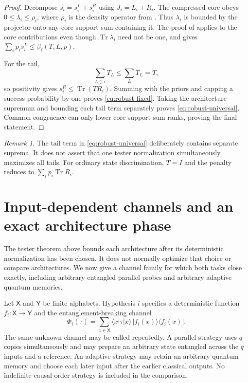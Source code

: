 \documentclass[11pt]{article}
\theoremstyle{definition}
\theoremstyle{remark}
\newtheorem{remark}[theorem]{Remark}
\newcommand{\Tr}{\operatorname{Tr}}
\newcommand{\ket}[1]{\lvert #1\rangle}
\newcommand{\bra}[1]{\langle #1\rvert}
\begin{document}
\begin{proof}
Decompose $s_i=s_i^L+s_i^R$ using $J_i=L_i+R_i$.  The compressed core obeys
$0\leq\lambda_i\leq\rho_i$, where $\rho_i$ is the density operator from
.  Thus $\lambda_i$ is bounded by the projector onto
any core support sum containing it.  The proof of  applies to
the core contributions even though $\Tr\lambda_i$ need not be one, and gives
$\sum_i p_i s_i^L\leq\beta_\ell(T,L,p)$.

For the tail,
\[
 \sum_{L\ni i}T_L\leq\sum_LT_L=T,
\]
so positivity gives $s_i^R\leq\Tr(TR_i)$.  Summing with the priors and capping
a success probability by one proves \eqref{eq:robust-fixed}.  Taking the
architecture supremum and bounding each tail term separately proves
\eqref{eq:robust-universal}.  Common congruence can only lower core
support-sum ranks, proving the final statement.
\end{proof}

\begin{remark}
The tail term in \eqref{eq:robust-universal} deliberately contains separate
suprema.  It does not assert that one tester normalization simultaneously
maximizes all tails.  For ordinary state discrimination, $T=I$ and the
penalty reduces to $\sum_i p_i\Tr R_i$.
\end{remark}

\section{Input-dependent channels and an exact architecture phase}
\label{sec:adaptive}

The tester theorem above bounds each architecture after its deterministic
normalization has been chosen.  It does not normally optimize that choice or
compare architectures.  We now give a channel family for which both tasks
close exactly, including arbitrary entangled parallel probes and arbitrary
adaptive quantum memories.

Let $\mathsf X$ and $\mathsf Y$ be finite alphabets.  Hypothesis $i$ specifies
a deterministic function $f_i:\mathsf X\to\mathsf Y$ and the
entanglement-breaking channel
\begin{equation}\label{eq:classical-channel}
 \Phi_i(\tau)=\sum_{x\in\mathsf X}
  \bra{x}\tau\ket{x}\,
  \ket{f_i(x)}\!\bra{f_i(x)}.
\end{equation}
The same unknown channel may be called repeatedly.  A parallel strategy uses
$q$ copies simultaneously and may prepare an arbitrary state entangled across
the $q$ inputs and a reference.  An adaptive strategy may retain an arbitrary
quantum memory and choose each later input after the earlier classical
outputs.  No indefinite-causal-order strategy is included in the comparison.
\end{document}
